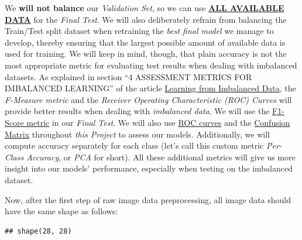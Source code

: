 \documentclass[
]{report}
\newenvironment{Shaded}{\begin{snugshade}}{\end{snugshade}}
\newcommand{\AttributeTok}[1]{\textcolor[rgb]{0.13,0.29,0.53}{#1}}
\newcommand{\DecValTok}[1]{\textcolor[rgb]{0.00,0.00,0.81}{#1}}
\newcommand{\FunctionTok}[1]{\textcolor[rgb]{0.13,0.29,0.53}{\textbf{#1}}}
\newcommand{\NormalTok}[1]{#1}
\newcommand{\SpecialCharTok}[1]{\textcolor[rgb]{0.81,0.36,0.00}{\textbf{#1}}}
\newcommand{\StringTok}[1]{\textcolor[rgb]{0.31,0.60,0.02}{#1}}
\begin{document}
\begin{noteblock}
We \textbf{will not balance} our \emph{Validation Set}, so we can use \textbf{\underline{ALL AVAILABLE DATA}} for the \emph{Final Test}.
We will also deliberately refrain from balancing the Train/Test split dataset when retraining the \emph{best final model} we manage to develop, thereby ensuring that the largest possible amount of available data is used for training.
We will keep in mind, though, that plain accuracy is not the most appropriate metric for evaluating test results when dealing with imbalanced datasets.
As explained in section ``4 ASSESSMENT METRICS FOR IMBALANCED LEARNING'' of the article \href{https://www.academia.edu/86894835/Learning_from_Imbalanced_Data}{Learning from Imbalanced Data}, the \emph{F-Measure metric} and the \emph{Receiver Operating Characteristic (ROC) Curves} will provide better results when dealing with \emph{imbalanced data}.\autocite{LFID_HHGE5128907}
We will use the \href{https://rafalab.dfci.harvard.edu/dsbook-part-2/ml/evaluation-metrics.html\#balanced-accuracy-and-f_1-score}{F1-Score metric} in our \emph{Final Test}. We will also use \href{https://rafalab.dfci.harvard.edu/dsbook-part-2/ml/evaluation-metrics.html\#roc-and-precision-recall-curves}{ROC curves} and the \href{https://rafalab.dfci.harvard.edu/dsbook-part-2/ml/evaluation-metrics.html\#the-confusion-matrix}{Confusion Matrix} throughout \emph{this Project} to assess our models. Additionally, we will compute accuracy separately for each class (let's call this custom metric \emph{Per-Class Accuracy}, or \emph{PCA} for short). All these additional metrics will give us more insight into our models' performance, especially when testing on the imbalanced dataset.\autocite{IDS2_27}

\end{noteblock}

Now, after the first step of raw image data preprocessing, all image data should have the same shape as follows:

\begin{Shaded}
\end{Shaded}

\begin{verbatim}
## shape(28, 28)
\end{verbatim}
\end{document}
